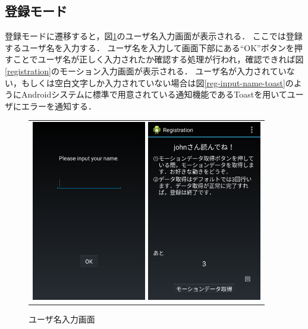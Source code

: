 \subsection{登録モード}
登録モードに遷移すると，図\ref{reg-input-name}のユーザ名入力画面が表示される．
ここでは登録するユーザ名を入力する．
ユーザ名を入力して画面下部にある``OK''ボタンを押すことでユーザ名が正しく入力されたか確認する処理が行われ，確認できれば図\ref{registration}のモーション入力画面が表示される．
ユーザ名が入力されていない，もしくは空白文字しか入力されていない場合は図\ref{reg-input-name-toast}のようにAndroidシステムに標準で用意されている通知機能であるToastを用いてユーザにエラーを通知する．

\begin{figure}[hbtp]
  \centering
  \begin{tabular}{c}
    \begin{minipage}{0.33\hsize}
      \centering
      \includegraphics[bb=0 0 1080 1705, width=5cm]{Screenshots/reg-input-name.pdf}
      \caption{ユーザ名入力画面}
      \label{reg-input-name}
    \end{minipage}
    \begin{minipage}{0.33\hsize}
      \centering
      \includegraphics[bb=0 0 1080 1705, width=5cm]{Screenshots/registration.pdf}

\end{minipage}
\end{tabular}
\end{figure}
